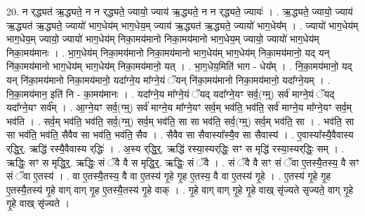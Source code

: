 \documentclass[17pt]{extarticle}
\begin{document}
20. न र्‌द्ध्यत॑ ऋ॒द्ध्यते॒ न न र्‌द्ध्यते॒ ज्यायो॒ ज्याय॑ ऋ॒द्ध्यते॒ न न र्‌द्ध्यते॒ ज्यायः॑ । . ऋ॒द्ध्यते॒ ज्यायो॒ ज्याय॑ ऋ॒द्ध्यत॑ ऋ॒द्ध्यते॒ ज्यायो॑ भाग॒धेय॑म् भाग॒धेय॒म् ज्याय॑ ऋ॒द्ध्यत॑ ऋ॒द्ध्यते॒ ज्यायो॑ भाग॒धेय᳚म् । . ज्यायो॑ भाग॒धेय॑म् भाग॒धेय॒म् ज्यायो॒ ज्यायो॑ भाग॒धेय॑म् निका॒मय॑मानो निका॒मय॑मानो भाग॒धेय॒म् ज्यायो॒ ज्यायो॑ भाग॒धेय॑म् निका॒मय॑मानः । . भा॒ग॒धेय॑म् निका॒मय॑मानो निका॒मय॑मानो भाग॒धेय॑म् भाग॒धेय॑म् निका॒मय॑मानो॒ यद् यन् नि॑का॒मय॑मानो भाग॒धेय॑म् भाग॒धेय॑म् निका॒मय॑मानो॒ यत् । . भा॒ग॒धेय॒मिति॑ भाग - धेय᳚म् । . नि॒का॒मय॑मानो॒ यद् यन् नि॑का॒मय॑मानो निका॒मय॑मानो॒ यदा᳚ग्ने॒य मा᳚ग्ने॒यं ॅयन् नि॑का॒मय॑मानो निका॒मय॑मानो॒ यदा᳚ग्ने॒यम् । . नि॒का॒मय॑मान॒ इति॑ नि - का॒मय॑मानः । . यदा᳚ग्ने॒य मा᳚ग्ने॒यं ॅयद् यदा᳚ग्ने॒यꣳ सर्व॒(ग्म्॒) सर्व॑ माग्ने॒यं ॅयद् यदा᳚ग्ने॒यꣳ सर्व᳚म् । . आ॒ग्ने॒यꣳ सर्व॒(ग्म्॒) सर्व॑ माग्ने॒य मा᳚ग्ने॒यꣳ सर्व॒म् भव॑ति॒ भव॑ति॒ सर्व॑ माग्ने॒य मा᳚ग्ने॒यꣳ सर्व॒म् भव॑ति । . सर्व॒म् भव॑ति॒ भव॑ति॒ सर्व॒(ग्म्॒) सर्व॒म् भव॑ति॒ सा सा भव॑ति॒ सर्व॒(ग्म्॒) सर्व॒म् भव॑ति॒ सा । . भव॑ति॒ सा सा भव॑ति॒ भव॑ति॒ सैवैव सा भव॑ति॒ भव॑ति॒ सैव । . सैवैव सा सैवास्या᳚स्यै॒व सा सैवास्य॑ । . ए॒वास्या᳚स्यै॒वैवास्य र्‌द्धि॒र्॒. ऋद्धि॑ रस्यै॒वैवास्य र्‌द्धिः॑ । . अ॒स्य र्‌द्धि॒र्॒. ऋद्धि॑ रस्या॒स्यर्‌द्धिः॒ सꣳ स मृद्धि॑ रस्या॒स्यर्‌द्धिः॒ सम् । . ऋद्धिः॒ सꣳ स मृद्धि॒र्॒. ऋद्धिः॒ सं ॅवै वै स मृद्धि॒र्॒. ऋद्धिः॒ सं ॅवै । . सं ॅवै वै सꣳ सं ॅवा ए॒तस्यै॒तस्य॒ वै सꣳ सं ॅवा ए॒तस्य॑ । . वा ए॒तस्यै॒तस्य॒ वै वा ए॒तस्य॑ गृ॒हे गृ॒ह ए॒तस्य॒ वै वा ए॒तस्य॑ गृ॒हे । . ए॒तस्य॑ गृ॒हे गृ॒ह ए॒तस्यै॒तस्य॑ गृ॒हे वाग् वाग् गृ॒ह ए॒तस्यै॒तस्य॑ गृ॒हे वाक् । . गृ॒हे वाग् वाग् गृ॒हे गृ॒हे वाख् सृ॑ज्यते सृज्यते॒ वाग् गृ॒हे गृ॒हे वाख् सृ॑ज्यते । \newline
\end{document}
